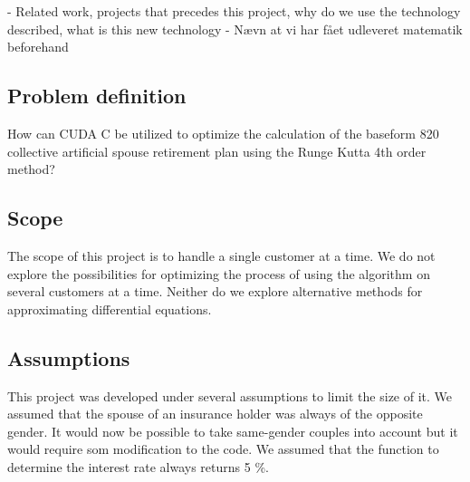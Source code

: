 - Related work, projects that precedes this project, why do we use the technology described, what is this new technology
- Nævn at vi har fået udleveret matematik beforehand

\subsection{Problem definition}
How can CUDA C be utilized to optimize the calculation of the baseform 820 collective artificial spouse retirement plan using the Runge Kutta 4th order method?

\subsection{Scope}
	The scope of this project is to handle a single customer at a time. We do not explore the possibilities for optimizing the process of using the algorithm on several customers at a time. Neither do we explore alternative methods for approximating differential equations.
	
\subsection{Assumptions}
This project was developed under several assumptions to limit the size of it. We assumed that the spouse of an insurance holder was always of the opposite gender. It would now be possible to take same-gender couples into account but it would require som modification to the code. We assumed that the function to determine the interest rate always returns 5 \%. 



